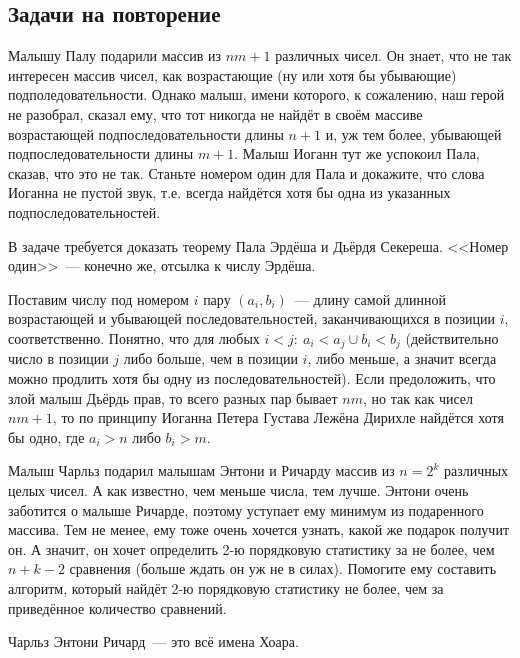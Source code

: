 \documentclass[addpoints]{exam}
\begin{document}
\begin{questions}
\section{Задачи на повторение}

\question[1] Малышу Палу подарили массив из $nm + 1$ различных чисел. Он знает, что не так интересен массив чисел, как возрастающие (ну или хотя бы убывающие) подполедовательности. Однако малыш, имени которого, к сожалению, наш герой не разобрал, сказал ему, что тот никогда не найдёт в своём массиве возрастающей подпоследовательности длины $n+1$ и, уж тем более, убывающей подпоследовательности длины $m+1$. Малыш Иоганн тут же успокоил Пала, сказав, что это не так. Станьте номером один для Пала и докажите, что слова Иоганна не пустой звук, т.е. всегда найдётся хотя бы одна из указанных подпоследовательностей.

\begin{solution}

В задаче требуется доказать теорему Пала Эрдёша и Дьёрдя Секереша. <<Номер один>>~--- конечно же, отсылка к числу Эрдёша.

Поставим числу под номером $i$ пару $(a_i, b_i)$~--- длину самой длинной возрастающей и убывающей последовательностей, заканчивающихся в позиции $i$, соответственно. Понятно, что для любых $i < j:\ a_i < a_j \cup b_i < b_j$ (действительно число в позиции $j$ либо больше, чем в позиции $i$, либо меньше, а значит всегда можно продлить хотя бы одну из последовательностей). Если предоложить, что злой малыш Дьёрдь прав, то всего разных пар бывает $nm$, но так как чисел $nm+1$, то по принципу Иоганна Петера Густава Лежёна Дирихле найдётся хотя бы одно, где $a_i > n$ либо $b_i > m$.

\end{solution}

\question[1] Малыш Чарльз подарил малышам Энтони и Ричарду массив из $n = 2^k$ различных целых чисел. А как известно, чем меньше числа, тем лучше. Энтони очень заботится о малыше Ричарде, поэтому уступает ему минимум из подаренного массива. Тем не менее, ему тоже очень хочется узнать, какой же подарок получит он. А значит, он хочет определить 2-ю порядковую статистику за не более, чем $n + k - 2$ сравнения (больше ждать он уж не в силах). Помогите ему составить алгоритм, который найдёт 2-ю порядковую статистику не более, чем за приведённое количество сравнений.

\begin{solution}

Чарльз Энтони Ричард~--- это всё имена Хоара.


\end{solution}
\end{questions}
\end{document}
